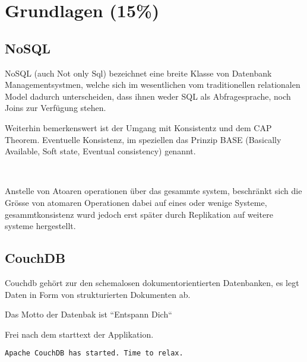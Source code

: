 \chapter{Grundlagen (15\%)}


\section{NoSQL}

NoSQL (auch Not only Sql) bezeichnet eine breite Klasse
von Datenbank Managementsystmen, welche sich im wesentlichen
vom traditionellen relationalen Model dadurch unterscheiden,
dass ihnen weder SQL als Abfragesprache, noch Joins zur Verfügung stehen.
~ \cite{wikipedia:nosql}


Weiterhin bemerkenswert ist der Umgang mit Konsistentz und dem CAP Theorem.
Eventuelle Konsistenz, im speziellen das Prinzip BASE (Basically Available, Soft state, Eventual consistency) genannt.

~ \cite{wikipedia:base}

Anstelle von Atoaren operationen über das gesammte system,
beschränkt sich die Grösse von atomaren Operationen dabei auf eines 
oder wenige Systeme, gesammtkonsistenz wurd jedoch erst später durch Replikation auf weitere systeme hergestellt.




\section{CouchDB}

Couchdb gehört zur den schemalosen dokumentorientierten Datenbanken,
es legt Daten in Form von strukturierten Dokumenten ab.

Das Motto der Datenbak ist ``Entspann Dich``

Frei nach dem starttext der Applikation.

\begin{verbatim}
Apache CouchDB has started. Time to relax.
\end{verbatim}


